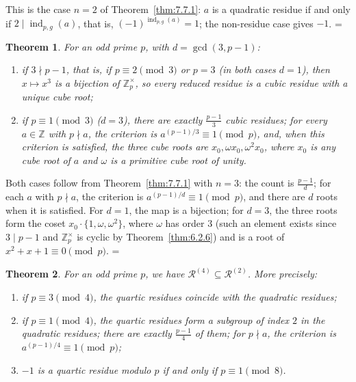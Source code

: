 \documentclass[11pt]{article}
\makeatletter
\theoremstyle{ntstyle}
\newtheorem{theorem}{Theorem}[subsection]
\let\nt@closedisplay\]
\def\nt@guardedclose{\@ifnextchar\par{\nt@closeafterpar}{\@ifnextchar\end{\postdisplaypenalty\@M\nt@closedisplay}{\nt@closedisplay}}}
\def\nt@closeafterpar\par{\@ifnextchar\par{\nt@closeafterpar}{\@ifnextchar\end{\postdisplaypenalty\@M\nt@closedisplay\par}{\nt@closedisplay\par}}}
\renewenvironment{proof}[1][\proofname]{\par
  \pushQED{\qed}\normalfont\topsep\medskipamount\edef\nt@afterproof{\@endparpenalty=\the\@endparpenalty\relax}\@beginparpenalty\@M\@endparpenalty\@M\let\]\nt@guardedclose\trivlist\item[]\textit{#1\@addpunct{.}} \ignorespaces}{\ifvmode\addpenalty\@M\fi\popQED\nt@afterproof\endtrivlist\@endpefalse}
\newcommand{\ZmodUnits}[1]{\mathbb{Z}_{#1}^{\times}}
\DeclareMathOperator{\ind}{ind}
\makeatother
\begin{document}
\begin{proof} This is the case $n = 2$ of Theorem~\ref{thm:7.7.1}:
	$a$ is a quadratic residue if and only if $2 \mid \ind_{p,g}(a)$,
	that is, $(-1)^{\ind_{p,g}(a)} = 1$; the non-residue case
	gives $-1$.
\end{proof}
\begin{theorem}\label{thm:7.7.5} For an odd prime
	$p$, with $d = \gcd(3, p-1)$:

	\begin{enumerate}[label={\alph*)}]
		\item if $3 \nmid p - 1$, that is, if $p \equiv 2 \pmod{3}$ or $p = 3$
					(in both cases $d = 1$), then $x \mapsto x^{3}$ is a bijection of
					$\ZmodUnits{p}$, so every reduced residue is a cubic residue
					with a unique cube root;
		\item if $p \equiv 1 \pmod{3}$ ($d = 3$), there are exactly
					$\tfrac{p-1}{3}$ cubic residues; for every $a\in\mathbb{Z}$ with
					$p\nmid a$, the criterion is $a^{(p-1)/3} \equiv 1\pmod{p}$,
					and, when this criterion is satisfied, the three cube roots are $x_0, \omega x_0, \omega^{2} x_0$, where
					$x_0$ is any cube root of $a$ and $\omega$ is a primitive cube root of unity.
	\end{enumerate}
\end{theorem}

\begin{proof} Both cases follow from Theorem~\ref{thm:7.7.1} with $n = 3$:
	the count is $\tfrac{p-1}{d}$; for each $a$ with $p\nmid a$, the criterion
	is $a^{(p-1)/d} \equiv 1 \pmod{p}$, and there are $d$ roots when it is
	satisfied. For $d = 1$, the map is a bijection; for
	$d = 3$, the three roots form the coset $x_0 \cdot \{1, \omega, \omega^{2}\}$, where $\omega$ has order $3$ (such
	an element exists since $3 \mid p-1$ and $\ZmodUnits{p}$ is cyclic by Theorem~\ref{thm:6.2.6}) and is a root of
	$x^{2} + x + 1 \equiv 0 \pmod{p}$.
\end{proof}

\begin{theorem}\label{thm:7.7.6} For an odd prime $p$,
	we have $\mathcal{R}^{(4)}\subseteq\mathcal{R}^{(2)}$. More precisely:

	\begin{enumerate}[label={\alph*)}]
		\item if $p \equiv 3 \pmod{4}$, the quartic residues
					coincide with the quadratic residues;
		\item if $p \equiv 1 \pmod{4}$, the quartic residues form a
					subgroup of index $2$ in the quadratic residues; there are exactly
					$\tfrac{p-1}{4}$ of them; for $p\nmid a$, the criterion is
					$a^{(p-1)/4} \equiv 1 \pmod{p}$;
		\item $-1$ is a quartic residue modulo $p$ if and only if
					$p\equiv1\pmod{8}$.
	\end{enumerate}
\end{theorem}
\end{document}
